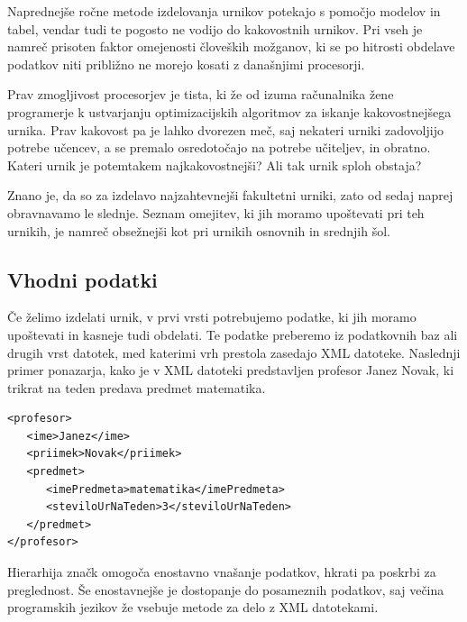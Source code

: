 \documentclass[10pt,a4paper]{article}
\begin{document}
Naprednejše ročne metode izdelovanja urnikov potekajo s pomočjo modelov in tabel, vendar
tudi te pogosto ne vodijo do kakovostnih urnikov. Pri vseh je namreč prisoten faktor
omejenosti človeških možganov, ki se po hitrosti obdelave podatkov niti približno ne
morejo kosati z današnjimi procesorji.

Prav zmogljivost procesorjev je tista, ki že od izuma računalnika žene programerje k
ustvarjanju optimizacijskih algoritmov za iskanje kakovostnejšega urnika. Prav kakovost
pa je lahko dvorezen meč, saj nekateri urniki zadovoljijo potrebe učencev, a se premalo
osredotočajo na potrebe učiteljev, in obratno. Kateri urnik je potemtakem najkakovostnejši?
Ali tak urnik sploh obstaja?

Znano je, da so za izdelavo najzahtevnejši fakultetni urniki, zato od sedaj naprej
obravnavamo le slednje. Seznam omejitev, ki jih moramo upoštevati pri teh urnikih,
je namreč obsežnejši kot pri urnikih osnovnih in srednjih šol.

\subsection{Vhodni podatki} %

Če želimo izdelati urnik, v prvi vrsti potrebujemo podatke, ki jih moramo upoštevati in
kasneje tudi obdelati. Te podatke preberemo iz podatkovnih baz ali drugih vrst datotek,
med katerimi vrh prestola zasedajo XML datoteke. Naslednji primer ponazarja, kako je v
XML datoteki predstavljen profesor Janez Novak, ki trikrat na teden predava predmet
matematika.


\begin{verbatim}
<profesor>
   <ime>Janez</ime>
   <priimek>Novak</priimek>
   <predmet>
      <imePredmeta>matematika</imePredmeta>
      <steviloUrNaTeden>3</steviloUrNaTeden>
   </predmet>
</profesor>

\end{verbatim}

Hierarhija značk omogoča enostavno vnašanje podatkov, hkrati pa poskrbi za preglednost.
Še enostavnejše je dostopanje do posameznih podatkov, saj večina programskih jezikov že
vsebuje metode za delo z XML datotekami.
\end{document}
